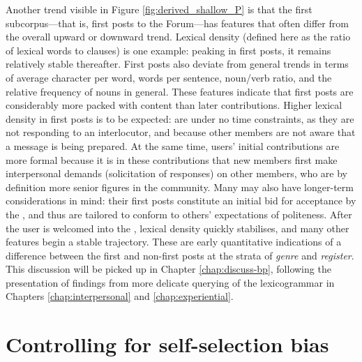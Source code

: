
Another trend visible in Figure \ref{fig:derived_shallow_P} is that the first subcorpus---that is, first \glspl{post} to the \gls{Forum}---has features that often differ from the overall upward or downward trend. Lexical density (defined here as the ratio of lexical words to clauses) is one example: peaking in first \glspl{post}, it remains relatively stable thereafter. First \glspl{post} also deviate from general trends in terms of average character per word, words per sentence, noun\slash verb ratio, and the relative frequency of nouns in general. These features indicate that first \glspl{post} are considerably more packed with content than later contributions. Higher lexical density in first \glspl{post} is to be expected:  are under no time constraints, as they are not responding to an interlocutor, and because other \glspl{member} are not aware that a message is being prepared. At the same time, users' initial contributions are more formal because it is in these contributions that new \glspl{member} first make interpersonal demands (solicitation of responses) on other \glspl{member}, who are by definition more senior figures in the community. Many  may also have longer\hyp{}term considerations in mind: their first \glspl{post} constitute an initial bid for acceptance by the , and thus are tailored to conform to others' expectations of politeness. After the user is welcomed into the , lexical density quickly stabilises, and many other features begin a stable trajectory. These are early quantitative indications of a difference between the first and non-first \glspl{post} at the strata of \emph{genre} and \emph{register}. This discussion will be picked up in Chapter \ref{chap:discuss-bp}, following the presentation of findings from more delicate querying of the \gls{lexicogrammar} in Chapters \ref{chap:interpersonal} and \ref{chap:experiential}.

\section{Controlling for self-selection bias}

